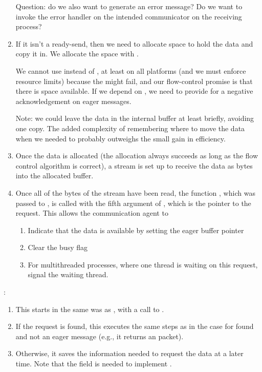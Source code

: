 \begin{enumerate}
  Question: do we also want to generate an error message?  Do we want to
  invoke the error handler on the intended communicator on the receiving
  process?  

\item If it isn't a ready-send, then we need to allocate space to hold the
  data and copy it in.  We allocate the space with
  . 

  We cannot
  use  instead of , at least on all
  platforms (and we must enforce 
  resource limits) because the  might fail, and our flow-control
  promise is that there is space available.  If we depend on , we
  need to provide for a negative acknowledgement on eager messages.

  Note: we could leave the data in the internal buffer at least briefly,
  avoiding one copy.  The added complexity of remembering where to move the
  data when we needed to probably outweighs the small gain in efficiency.

\item Once the data is allocated (the allocation always succeeds as long as
  the flow control algorithm is correct), a stream is set up to receive the
  data as bytes into the allocated buffer.  

\item Once all of the bytes of the stream have been read, the function
  , which was passed to
  , is called with the fifth argument of
  , which is the pointer to the request.  This
  allows the communication agent to 
  \begin{enumerate}
  \item Indicate that the data is available by setting the eager buffer
    pointer
  \item Clear the busy flag
  \item For multithreaded processes, where one thread is waiting on this
    request, signal the waiting thread.
  \end{enumerate}

\end{enumerate}

:
\begin{enumerate}
\item This starts in the same was as , with a call
  to .  

\item If the request is found, this executes the same steps as in the
   case for found and not an eager message (e.g., it
  returns an  packet).

\item Otherwise, it saves the information needed to request the data at a
  later time. Note
  that the  field is needed to
  implement . 
\end{enumerate}

